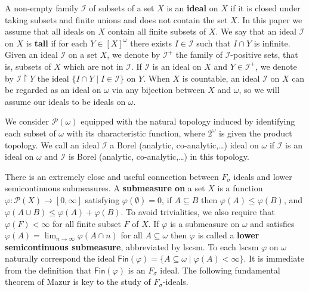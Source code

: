 \documentclass{amsart}
\theoremstyle{definition}
\theoremstyle{remark}
\numberwithin{equation}{section}
\newcommand{\restr}[2]{#1\upharpoonright {#2}}
\begin{document}
A non-empty family $\mathcal{I}$ of subsets of a set $X$ is an {\bf ideal} on $X$ if it is closed under taking subsets and finite unions and does not contain the set $X$. In this paper we assume that all ideals on $X$ contain all finite subsets of $X$. We say that an ideal $\mathcal{I}$ on $X$ is {\bf tall} if for each $Y \in [X]^{\omega}$ 
there exists $I \in \mathcal{I}$ such that $I \cap Y$ is infinite. Given an ideal $\mathcal{I}$ on a set $X$, we denote by $\mathcal{I}^{+}$ the family of $\mathcal{I}$-positive sets, that is, subsets of $X$ which are not in $\mathcal{I}$. If $\mathcal{I}$ is an ideal on $X$ and $Y \in \mathcal{I}^{+}$, we denote by $\restr{\mathcal{I}}{Y}$ the ideal $\{I \cap Y \mid  I \in \mathcal{I}\}$ on $Y$. When $X$ is countable, an ideal $\mathcal{I}$ on $X$ can be regarded as an ideal on $\omega$ via any bijection between $X$ and $\omega$, so we will assume our ideals to be ideals on $\omega$.

We consider $\mathcal{P}(\omega)$ equipped with the natural topology induced by identifying each subset of $\omega$ with its characteristic function, where $2^{\omega}$ is given the product topology. We call an ideal $\mathcal{I}$ a Borel (analytic, co-analytic,\dots) ideal on $\omega$ if $\mathcal{I}$ is an ideal on $\omega$ and $\mathcal{I}$ is Borel (analytic, co-analytic,\dots) in this topology.



There is an extremely close and useful connection between $F_{\sigma}$ ideals and lower semicontinuous submeasures. A {\bf submeasure on} a set $X$ is a function $\varphi \colon \mathcal{P}(X) \to [0, \infty]$ satisfying $\varphi(\emptyset)=0$, if $A \subseteq B$ then $\varphi(A) \leqslant \varphi(B)$, and $\varphi( A\cup B) \leqslant \varphi(A) + \varphi(B)$. To avoid trivialities, we also require that $\varphi(F) < \infty$ for all finite subset $F$ of $X$. If $\varphi$ is a submeasure on $\omega$ and satisfies $\varphi(A)=\lim_{n \to \infty}\varphi(A \cap n)$ for all $A \subseteq \omega$ then $\varphi$ is called a {\bf lower semicontinuous submeasure}, abbreviated by lscsm. To each lscsm $\varphi$ on $\omega$ naturally correspond the ideal $\mathsf{Fin}(\varphi)=\{A \subseteq \omega \mid  \varphi(A) < \infty\}$. It is immediate from the definition that $\mathsf{Fin}(\varphi)$ is an $F_{\sigma}$ ideal. The following fundamental theorem of Mazur is key to the study of $F_{\sigma}$-ideals.
\end{document}
